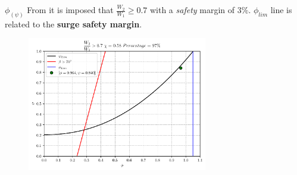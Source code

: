 	\begin{frame}{$\phi_{(\psi)}$}
		From \cite[Sec. 10.4]{axial2004} it is imposed that $\frac{W_2}{W_1} \geq 0.7$ with a \textit{safety} margin of $3 \%$. $\phi_{lim}$ line\let\thefootnote\relax{} \let\thefootnote\svthefootnote is related to the \textbf{surge safety margin}.  
		\begin{figure}
			\centering
			\includegraphics[width=0.7\textwidth]{figures/stagePerf.pdf}
		\end{figure}
	\end{frame}

